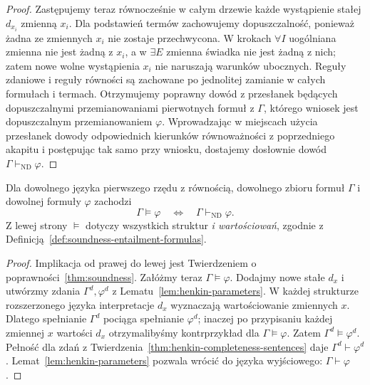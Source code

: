 \begin{proof}
Zastępujemy teraz równocześnie w całym drzewie każde wystąpienie stałej $d_{x_i}$ zmienną $x_i$. Dla podstawień termów zachowujemy dopuszczalność, ponieważ żadna ze zmiennych $x_i$ nie zostaje przechwycona. W krokach $\forall I$ uogólniana zmienna nie jest żadną z $x_i$, a w $\exists E$ zmienna świadka nie jest żadną z nich; zatem nowe wolne wystąpienia $x_i$ nie naruszają warunków ubocznych. Reguły zdaniowe i reguły równości są zachowane po jednolitej zamianie w całych formułach i termach. Otrzymujemy poprawny dowód z przesłanek będących dopuszczalnymi przemianowaniami pierwotnych formuł z $\Gamma$, którego wniosek jest dopuszczalnym przemianowaniem $\varphi$. Wprowadzając w miejscach użycia przesłanek dowody odpowiednich kierunków równoważności z poprzedniego akapitu i postępując tak samo przy wniosku, dostajemy dosłownie dowód $\Gamma\vdash_{\mathrm{ND}}\varphi$.
\end{proof}

\begin{twierdzenie}\label{thm:godel-completeness}
Dla dowolnego języka pierwszego rzędu z równością, dowolnego zbioru formuł $\Gamma$ i dowolnej formuły $\varphi$ zachodzi
\[
\Gamma\models\varphi\quad\Longleftrightarrow\quad\Gamma\vdash_{\mathrm{ND}}\varphi.
\]
Z lewej strony $\models$ dotyczy wszystkich struktur \emph{i wartościowań}, zgodnie z Definicją~\ref{def:soundness-entailment-formulas}.
\end{twierdzenie}
\begin{proof}
Implikacja od prawej do lewej jest Twierdzeniem o poprawności~\ref{thm:soundness}. Załóżmy teraz $\Gamma\models\varphi$. Dodajmy nowe stałe $d_x$ i utwórzmy zdania $\Gamma^d,\varphi^d$ z Lematu~\ref{lem:henkin-parameters}. W każdej strukturze rozszerzonego języka interpretacje $d_x$ wyznaczają wartościowanie zmiennych $x$. Dlatego spełnianie $\Gamma^d$ pociąga spełnianie $\varphi^d$; inaczej po przypisaniu każdej zmiennej $x$ wartości $d_x$ otrzymalibyśmy kontrprzykład dla $\Gamma\models\varphi$. Zatem $\Gamma^d\models\varphi^d$. Pełność dla zdań z Twierdzenia~\ref{thm:henkin-completeness-sentences} daje $\Gamma^d\vdash\varphi^d$. Lemat~\ref{lem:henkin-parameters} pozwala wrócić do języka wyjściowego: $\Gamma\vdash\varphi$.
\end{proof}


